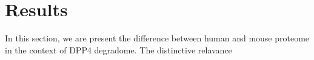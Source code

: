 \section{Results}
In this section, we are present the difference between human and mouse proteome in the context of DPP4 degradome. The distinctive relavance 

